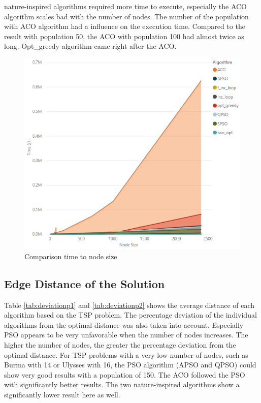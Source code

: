 \documentclass[conference]{IEEEtran}
\begin{document}
   nature-inspired algorithms required more time to execute, especially the ACO algorithm scales bad with the number of nodes. 
   The number of the population with ACO algorithm had a influence on the execution time. Compared to the result with population 50, the ACO with population 100 had almost twice as long. Opt\_greedy algorithm came right after the ACO. 
	  \begin{figure}[H]
    		\centering
    		\includegraphics[width=\columnwidth]{time_node_alg.png}
    		\caption{Comparison time to node size}
    		\label{fig:timenodesize}
	    \end{figure}

    \subsection{Edge Distance of the Solution}
    Table \ref{tab:deviationp1} and \ref{tab:deviationp2} shows the average distance of each algorithm based on the TSP problem. The percentage deviation of the individual algorithms from the optimal distance was also taken into account. Especially PSO appears to be very unfavorable when the number of nodes increases. The higher the number of nodes, the greater the percentage deviation from the optimal distance. For TSP problems with a very low number of nodes, such as Burma with 14 or Ulysses with 16, the PSO algorithm (APSO and QPSO) could show very good results with a population of 150. The ACO followed the PSO with significantly better results. The two nature-inspired algorithms show a significantly lower result here as well.
    
\end{document}

